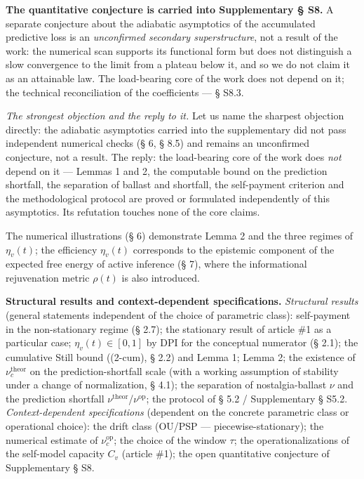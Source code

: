 \documentclass[pdflatex,sn-mathphys-ay]{sn-jnl}
\begin{document}
\textbf{The quantitative conjecture is carried into Supplementary § S8.} A separate conjecture about the adiabatic asymptotics of the accumulated predictive loss is an \emph{unconfirmed secondary superstructure}, not a result of the work: the numerical scan supports its functional form but does not distinguish a slow convergence to the limit from a plateau below it, and so we do not claim it as an attainable law. The load-bearing core of the work does not depend on it; the technical reconciliation of the coefficients --- § S8.3.



\emph{The strongest objection and the reply to it.} Let us name the sharpest objection directly: the adiabatic asymptotics carried into the supplementary did not pass independent numerical checks (§ 6, § 8.5) and remains an unconfirmed conjecture, not a result. The reply: the load-bearing core of the work does \emph{not} depend on it --- Lemmas 1 and 2, the computable bound on the prediction shortfall, the separation of ballast and shortfall, the self-payment criterion and the methodological protocol are proved or formulated independently of this asymptotics. Its refutation touches none of the core claims.



The numerical illustrations (§ 6) demonstrate Lemma 2 and the three regimes of \(\eta_v(t)\); the efficiency \(\eta_v(t)\) corresponds to the epistemic component of the expected free energy of active inference (§ 7), where the informational rejuvenation metric \(\rho(t)\) is also introduced.



\textbf{Structural results and context-dependent specifications.} \emph{Structural results} (general statements independent of the choice of parametric class): self-payment in the non-stationary regime (§ 2.7); the stationary result of article \#1 as a particular case; \(\eta_v(t) \in [0, 1]\) by DPI for the conceptual numerator (§ 2.1); the cumulative Still bound ((2-cum), § 2.2) and Lemma 1; Lemma 2; the existence of \(\nu_c^{\text{theor}}\) on the prediction-shortfall scale (with a working assumption of stability under a change of normalization, § 4.1); the separation of nostalgia-ballast \(\nu\) and the prediction shortfall \(\nu^{\text{theor}}\)/\(\nu^{\text{op}}\); the protocol of § 5.2 / Supplementary § S5.2. \emph{Context-dependent specifications} (dependent on the concrete parametric class or operational choice): the drift class (OU/PSP --- piecewise-stationary); the numerical estimate of \(\nu_c^{\text{op}}\); the choice of the window \(\tau\); the operationalizations of the self-model capacity \(C_v\) (article \#1); the open quantitative conjecture of Supplementary § S8.
\end{document}
